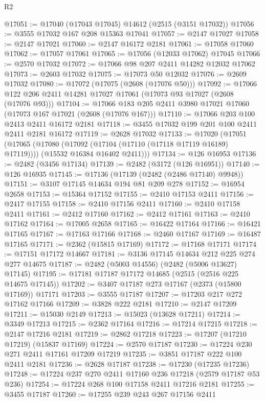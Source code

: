 \begin{lexlean}{R2}
\begin{coremodule}
@17051 := @17040 (@17043 @17045) @14612 (@2515 (@3151 @17032))
@17056 := @3555 @17032 @167 @208 @15363 @17041
@17057 := @2147 @17027
@17058 := @2147 @17021
@17060 := @2147 @16172 @2181
@17061 := @17058 @17060
@17062 := @17057 @17061
@17065 := @17056 (@12033 @17062) @17045
@17066 := @2570 @17032
@17072 := @17066 @98 @207 @2411 @14282 @12032 @17062
@17073 := @2603 @17032
@17075 := @17073 @50 @12032
@17076 := @2609 @17032
@17080 := @17072 (@17075 (@2608 (@17076 @50)))
@17092 := @17066 @122 @206 @2411 @14281 @17027 @17061 (@17073 @93 @17027 (@2608 (@17076 @93)))
@17104 := @17066 @183 @205 @2411 @3980 @17021 @17060 (@17073 @167 @17021 (@2608 (@17076 @167)))
@17110 := @17066 @203 @100 @2413 @2411 @16172 @2181
@17118 := @3455 @17032 @199 @201 @100 @2411 @2411 @2181 @16172
@17119 := @2628 @17032
@17133 := @17020
    (@17051
      (@17065
        (@17080 (@17092 (@17104 (@17110 (@17118 @17119 @16189) @17119))))
        (@15532 @16384 @16402 @2411)))
@17134 := @126 @16953
@17136 := @2482 (@3456 @17134)
@17139 := @2482 (@3172 (@126 @16951))
@17140 := @126 @16935
@17145 := @17136 (@17139 (@2482 (@2486 @17140) @9948))
@17151 := @3107 @17145 @14634 @194 @81 @209 @278
@17152 := @16954 @2658
@17153 := @15364 @17152
@17155 := @2410 @17153 @2411
@17156 := @2417 @17155
@17158 := @2410 @17156 @2411
@17160 := @2410 @17158 @2411
@17161 := @2412 @17160
@17162 := @2412 @17161
@17163 := @2410 @17162
@17164 := @17005 @2658
@17165 := @16422 @17164
@17166 := @16421 @17165
@17167 := @17163 @17166
@17168 := @2460 @17167
@17169 := @16487 @17165
@17171 := @2362 (@15815 @17169)
@17172 := @17168 @17171
@17174 := @17151 @17172 @14667
@17181 := @3136 @17145 @14634 @212 @225 @274 @277 @14675
@17187 := @2482 (@5003 @14556) (@2482 (@5006 @13627) @17145)
@17195 := @17181 @17187 @17172 @14685 (@2515 (@2516 @225 @14675 @17145))
@17202 := @3407 @17187 @273 @17167 (@2373 (@15800 @17169)) @17171
@17203 := @3555 @17187
@17207 := @17203 @217 @272 @17162 @17166
@17209 := @3828 @222 @2181
@17210 := @2147 @17209
@17211 := @15030 @2149
@17213 := @15023 (@13628 @17211)
@17214 := @3349 @17213
@17215 := @2362 @17164
@17216 := @17214 @17215
@17218 := @2147 @17216 @2181
@17219 := @2862 @17218
@17223 := @17207 (@17210 @17219) (@15837 @17169)
@17224 := @2570 @17187
@17230 := @17224 @230 @271 @2411 @17161 @17209 @17219
@17235 := @3851 @17187 @222 @100 @2411 @2181
@17236 := @2628 @17187
@17238 := @17230 (@17235 @17236)
@17248 := @17224 @237 @270 @2411 @17160 @236 @17218 (@2579 @17187 @53 @236)
@17254 := @17224 @268 @100 @17158 @2411 @17216 @2181
@17255 := @3455 @17187
@17260 := @17255 @239 @243 @267 @17156 @2411

\end{coremodule}
\end{lexlean}
